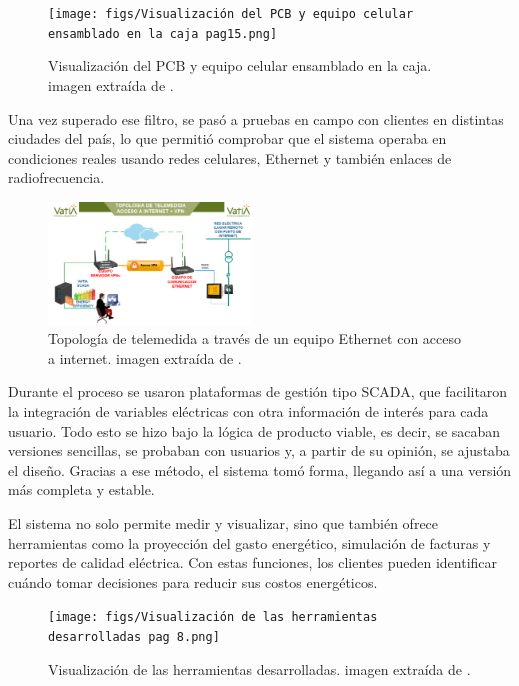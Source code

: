 \begin{figure}[h!]
\centering
\texttt{[image: figs/Visualización del PCB y equipo celular ensamblado en la caja pag15.png]}
\caption{Visualización del PCB y equipo celular ensamblado en la caja. imagen extraída de \cite[pag.~15]{Jaramillo2022}.}
\label{fig:factura3}
\end{figure}

Una vez superado ese filtro, se pasó a pruebas en campo con clientes en distintas ciudades del país, lo que permitió comprobar que el sistema operaba en condiciones reales usando redes celulares, Ethernet y también enlaces de radiofrecuencia.

\begin{figure}[h!]
\centering
\includegraphics[width=0.48\textwidth]{figs/Topología de telemedida a través de un equipo Ethernet con acceso a internet pag 12.png}
\caption{Topología de telemedida a través de un equipo Ethernet con acceso a internet. imagen extraída de \cite[pag.~12]{Jaramillo2022}.}
\label{fig:factura1}
\end{figure}

Durante el proceso se usaron plataformas de gestión tipo SCADA, que facilitaron la integración de variables eléctricas con otra información de interés para cada usuario. Todo esto se hizo bajo la lógica de producto viable, es decir, se sacaban versiones sencillas, se probaban con usuarios y, a partir de su opinión, se ajustaba el diseño. Gracias a ese método, el sistema tomó forma, llegando así a una versión más completa y estable.

El sistema no solo permite medir y visualizar, sino que también ofrece herramientas como la proyección del gasto energético, simulación de facturas y reportes de calidad eléctrica. Con estas funciones, los clientes pueden identificar cuándo tomar decisiones para reducir sus costos energéticos.

\begin{figure}[h!]
\centering
\texttt{[image: figs/Visualización de las herramientas desarrolladas pag 8.png]}
\caption{Visualización de las herramientas desarrolladas. imagen extraída de \cite[pag.~8]{Jaramillo2022}.}
\label{fig:factura2}
\end{figure}

